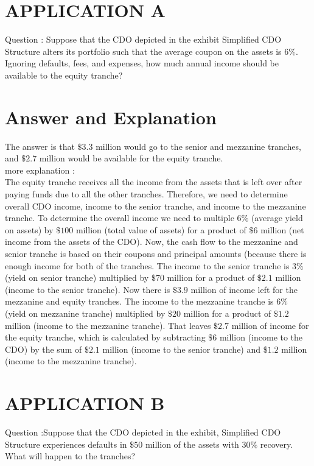 \documentclass[11pt]{article}
\begin{document}
\section*{APPLICATION A}
Question : Suppose that the CDO depicted in the exhibit Simplified CDO Structure alters its portfolio such that the average coupon on the assets is $6 \%$. Ignoring defaults, fees, and expenses, how much annual income should be available to the equity tranche?

\section*{Answer and Explanation}
The answer is that $\$ 3.3$ million would go to the senior and mezzanine tranches, and $\$ 2.7$ million would be available for the equity tranche.\\
more explanation :\\
The equity tranche receives all the income from the assets that is left over after paying funds due to all the other tranches. Therefore, we need to determine overall CDO income, income to the senior tranche, and income to the mezzanine tranche. To determine the overall income we need to multiple $6 \%$ (average yield on assets) by $\$ 100$ million (total value of assets) for a product of $\$ 6$ million (net income from the assets of the CDO). Now, the cash flow to the mezzanine and senior tranche is based on their coupons and principal amounts (because there is enough income for both of the tranches. The income to the senior tranche is $3 \%$ (yield on senior tranche) multiplied by $\$ 70$ million for a product of $\$ 2.1$ million (income to the senior tranche). Now there is $\$ 3.9$ million of income left for the mezzanine and equity tranches. The income to the mezzanine tranche is $6 \%$ (yield on mezzanine tranche) multiplied by $\$ 20$ million for a product of $\$ 1.2$ million (income to the mezzanine tranche). That leaves $\$ 2.7$ million of income for the equity tranche, which is calculated by subtracting $\$ 6$ million (income to the CDO) by the sum of $\$ 2.1$ million (income to the senior tranche) and $\$ 1.2$ million (income to the mezzanine tranche).

\section*{APPLICATION B}
Question :Suppose that the CDO depicted in the exhibit, Simplified CDO Structure experiences defaults in $\$ 50$ million of the assets with $30 \%$ recovery. What will happen to the tranches?
\end{document}
